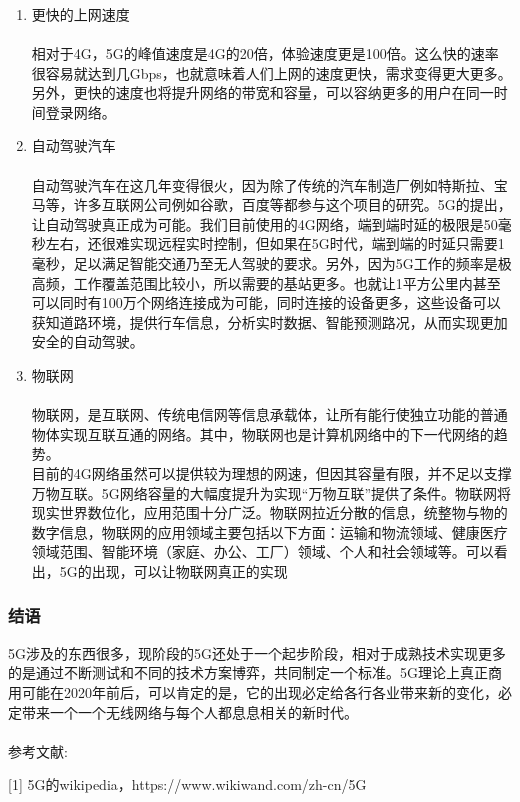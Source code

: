 \documentclass[a4paper]{ctexart}
\begin{document}
\subsubsection*{}
\begin{enumerate}
\item 更快的上网速度

\paragraph{} 
\small 相对于4G，5G的峰值速度是4G的20倍，体验速度更是100倍。这么快的速率很容易就达到几Gbps，也就意味着人们上网的速度更快，需求变得更大更多。\\
 另外，更快的速度也将提升网络的带宽和容量，可以容纳更多的用户在同一时间登录网络。
 
\item 自动驾驶汽车
\paragraph{}
\small 自动驾驶汽车在这几年变得很火，因为除了传统的汽车制造厂例如特斯拉、宝马等，许多互联网公司例如谷歌，百度等都参与这个项目的研究。5G的提出，让自动驾驶真正成为可能。我们目前使用的4G网络，端到端时延的极限是50毫秒左右，还很难实现远程实时控制，但如果在5G时代，端到端的时延只需要1毫秒，足以满足智能交通乃至无人驾驶的要求。另外，因为5G工作的频率是极高频，工作覆盖范围比较小，所以需要的基站更多。也就让1平方公里内甚至可以同时有100万个网络连接成为可能，同时连接的设备更多，这些设备可以获知道路环境，提供行车信息，分析实时数据、智能预测路况，从而实现更加安全的自动驾驶。

\item 物联网
\paragraph{}
\small
物联网，是互联网、传统电信网等信息承载体，让所有能行使独立功能的普通物体实现互联互通的网络。其中，物联网也是计算机网络中的下一代网络的趋势。\\
目前的4G网络虽然可以提供较为理想的网速，但因其容量有限，并不足以支撑万物互联。5G网络容量的大幅度提升为实现“万物互联”提供了条件。物联网将现实世界数位化，应用范围十分广泛。物联网拉近分散的信息，统整物与物的数字信息，物联网的应用领域主要包括以下方面：运输和物流领域、健康医疗领域范围、智能环境（家庭、办公、工厂）领域、个人和社会领域等。可以看出，5G的出现，可以让物联网真正的实现
\end{enumerate}

\subsubsection*{结语}
\small 
  5G涉及的东西很多，现阶段的5G还处于一个起步阶段，相对于成熟技术实现更多的是通过不断测试和不同的技术方案博弈，共同制定一个标准。5G理论上真正商用可能在2020年前后，可以肯定的是，它的出现必定给各行各业带来新的变化，必定带来一个一个无线网络与每个人都息息相关的新时代。\\ \\ 参考文献:


[1] 5G的wikipedia，https://www.wikiwand.com/zh-cn/5G

\end{document}
